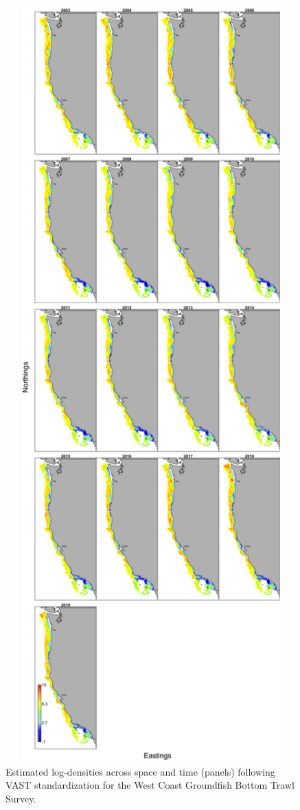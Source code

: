 \documentclass[11pt,
  english,
  a4paper,
]{article}
\begin{document}
\tagmcend\tagstructend


\begin{figure}
\centering
\includegraphics[width=1\textwidth,height=1\textheight]{figs/ln_density-predicted.png}
\caption{Estimated log-densities across space and time (panels) following VAST standardization for the West Coast Groundfish Bottom Trawl Survey. \label{fig:surveydensWCGBT1}}
\end{figure}
\end{document}
